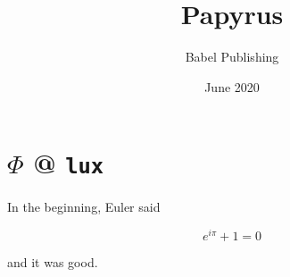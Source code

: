 \documentclass{article}
\title{Papyrus}
\author{Babel Publishing}
\date{June 2020}
\begin{document}
\maketitle

\section{$\Phi$ \textrm{@} \texttt{lux}}

In the beginning, Euler said

\begin{equation}
e^{i \pi} + 1 = 0
\end{equation}

\noindent
and it was good.
\end{document}
